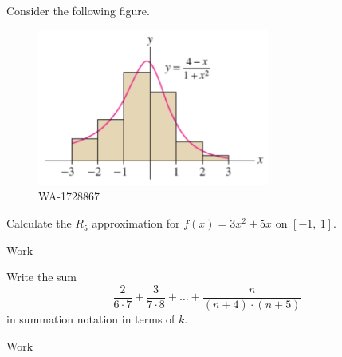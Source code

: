 \documentclass[12pt,addpoints, answers, fleqn]{exam}
\begin{document}
\begin{teacher}
\begin{questions}
 
\question 	%

Consider the following figure.
\begin{figure}[htbp] %
   \centering
   \includegraphics[width=3in]{./graphics/1728867.pdf} 
   \caption{WA-1728867}
   \label{fig:1728867}
\end{figure}

\question 	%

Calculate the $R_5$ approximation for $f\left(x\right) = 3x^2 + 5x$ on $\left[-1,\ 1 \right]$.

\begin{solution}
Work
\end{solution}

\question 	%

Write the sum
\[
\frac{2}{6 \cdot 7} + \frac{3}{7 \cdot 8} + \dots + \frac{n}{\left(n+4\right) \cdot \left(n+5\right)}
\]
in summation notation in terms of $k$.

\begin{solution}
Work
\end{solution}



\end{questions}
\end{teacher}
\end{document}

